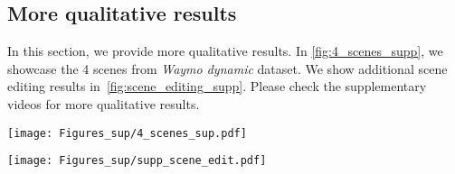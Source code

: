 \subsection{More qualitative results}
\label{sec:sup_visual}
In this section, we provide more qualitative results. In \cref{fig:4_scenes_supp}, we showcase the 4 scenes from \textit{Waymo dynamic} dataset. We show additional scene editing results in~\cref{fig:scene_editing_supp}. Please check the supplementary videos for more qualitative results.

\begin{figure*}[t]
  \centering
   \texttt{[image: Figures\_sup/4\_scenes\_sup.pdf]}
   \caption{Visualization of 4 selected scenes from \textit{Waymo Dynamic} dataset. For each scene, we aggregate 50 frames. In the first row, points are color-coded by the intensity values(0 ~\bwrDyNFL~ 0.25). In the second row, dynamic vehicles are painted as \textcolor{yellow}{yellow}.}
   \label{fig:4_scenes_supp}
\end{figure*}

\begin{figure*}[t]
  \centering
   \texttt{[image: Figures\_sup/supp\_scene\_edit.pdf]}
   \caption{Visualization of scene editing capabilities. We showcase 3 kinds of scene editing capabilities including vehicle removal(left), trajectory manipulation(middle) and vehicle insertion(right). The first row represents the original scenes, the second row demonstrates the scenes after editing. All points are color-coded by the intensity values(0 ~\bwrDyNFL~ 0.25).}
   \label{fig:scene_editing_supp}
\end{figure*}

